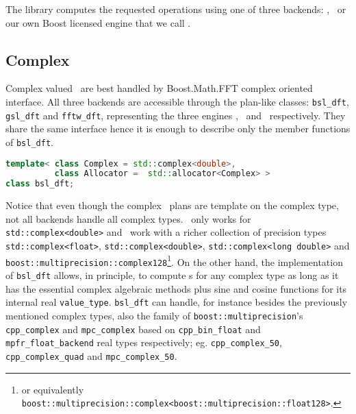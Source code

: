 The library computes the requested operations using one of three backends:
\gsl, \fftw\ or our own Boost licensed engine that we call \bsl. 

\subsection{Complex \dft}
Complex valued \dft\ are best handled by Boost.Math.FFT complex oriented
interface. All three backends are accessible through the plan-like classes:
\verb|bsl_dft|, \verb|gsl_dft| and \verb|fftw_dft|, representing the three
engines \bsl, \gsl\ and \fftw\ respectively. They share the same interface hence
it is enough to describe only the member functions of \verb|bsl_dft|.
\begin{lstlisting}[language=C++,caption=Complex plan declaration.]
template< class Complex = std::complex<double>, 
          class Allocator =  std::allocator<Complex> >
class bsl_dft;
\end{lstlisting}

Notice that even though the complex \dft\ plans are template on the complex
type, not all backends handle all complex types. \gsl\ only works for
\verb|std::complex<double>| and \fftw\ work with a richer collection of
precision types
\verb|std::complex<float>|, \verb|std::complex<double>|, 
\verb|std::complex<long double>| and
\verb|boost::multiprecision::complex128|\footnote{or equivalently
\texttt{boost::multiprecision::complex<boost::multiprecision::float128>}.}.
On the other hand, the implementation of \verb|bsl_dft| allows, in principle, to
compute \dft s
for any complex type as long as it has the essential complex
algebraic methods plus sine and cosine functions for its internal real
\verb|value_type|.
\verb|bsl_dft| can handle, for instance besides the previously mentioned complex types,
also the family of \verb|boost::multiprecision|'s \verb|cpp_complex|
and \verb|mpc_complex| based on \verb|cpp_bin_float| and
\verb|mpfr_float_backend| real types respectively; eg.
\verb|cpp_complex_50|, 
\verb|cpp_complex_quad| and 
\verb|mpc_complex_50|.

